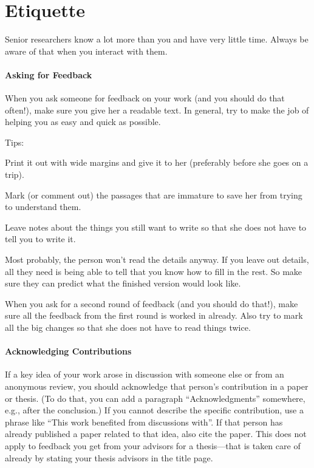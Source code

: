 \documentclass[12pt]{article}
\begin{document}
\section{Etiquette}

Senior researchers know a lot more than you and have very little time.
Always be aware of that when you interact with them.

\paragraph{Asking for Feedback}
When you ask someone for feedback on your work (and you should do that often!), make sure you give her a readable text.
In general, try to make the job of helping you as easy and quick as possible.

Tips:
\begin{compactitem}
\item Print it out with wide margins and give it to her (preferably before she goes on a trip).
\item Mark (or comment out) the passages that are immature to save her from trying to understand them.
\item Leave notes about the things you still want to write so that she does not have to tell you to write it.
\item Most probably, the person won't read the details anyway. If you leave out details, all they need is being able to tell that you know how to fill in the rest.
So make sure they can predict what the finished version would look like.
\item When you ask for a second round of feedback (and you should do that!), make sure all the feedback from the first round is worked in already. Also try to mark all the big changes so that she does not have to read things twice.
\end{compactitem}

\paragraph{Acknowledging Contributions}
If a key idea of your work arose in discussion with someone else or from an anonymous review, you should acknowledge that person's contribution in a paper or thesis. (To do that, you can add a paragraph ``Acknowledgments'' somewhere, e.g., after the conclusion.)
If you cannot describe the specific contribution, use a phrase like ``This work benefited from discussions with''.
If that person has already published a paper related to that idea, also cite the paper.
This does not apply to feedback you get from your advisors for a thesis---that is taken care of already by stating your thesis advisors in the title page.
\end{document}
